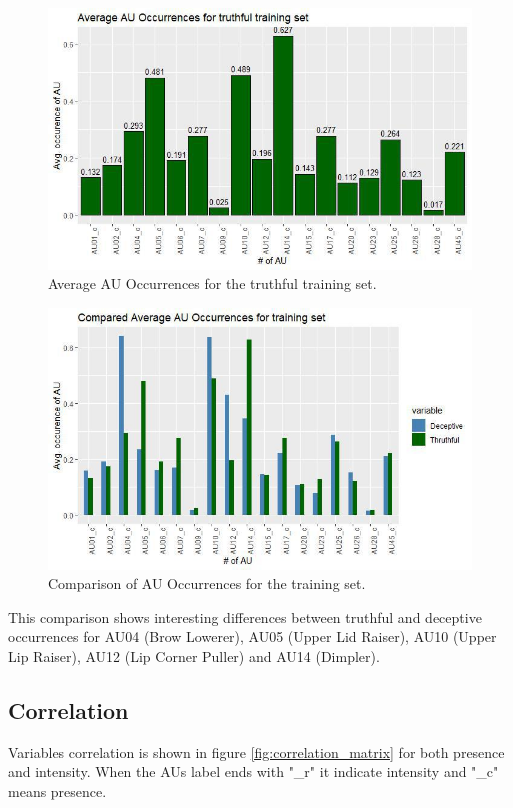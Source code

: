 \clearpage

\begin{figure}[H]
	\centering
	\includegraphics[width=1\textwidth]{images/au_occ_truth}
	\caption{Average AU Occurrences for the truthful training set.}
	\label{fig:au_occ_truth}
\end{figure}

\begin{figure}[H]
	\centering
	\includegraphics[width=1\textwidth]{images/au_occ_comp}
	\caption{Comparison of AU Occurrences for the training set.}
	\label{fig:au_occ_comp}
\end{figure}

This comparison shows interesting differences between truthful and deceptive occurrences for AU04 (Brow Lowerer), AU05 (Upper Lid Raiser), AU10 (Upper Lip Raiser), AU12 (Lip Corner Puller) and AU14 (Dimpler). %

\subsection{Correlation} \label{corr}
Variables correlation is shown in figure \ref{fig:correlation_matrix} for both presence and intensity. When the AUs label ends with "\_r" it indicate intensity and "\_c" means presence.

